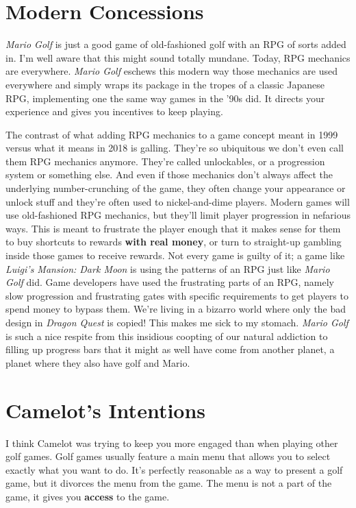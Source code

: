 \documentclass{book}
\begin{document}
\FloatBarrier\needspace{5pt}\section*{Modern Concessions}\nopagebreak[4]

\emph{Mario Golf} is just a good game of old-fashioned golf with an RPG of sorts added in. I’m well aware that this might sound totally mundane. Today, RPG mechanics are everywhere. \emph{Mario Golf} eschews this modern way those mechanics are used everywhere and simply wraps its package in the tropes of a classic Japanese RPG, implementing one the same way games in the ’90s did. It directs your experience and gives you incentives to keep playing.

The contrast of what adding RPG mechanics to a game concept meant in 1999 versus what it means in 2018 is galling. They’re so ubiquitous we don’t even call them RPG mechanics anymore. They’re called unlockables, or a progression system or something else. And even if those mechanics don’t always affect the underlying number-crunching of the game, they often change your appearance or unlock stuff and they’re often used to nickel-and-dime players. Modern games will use old-fashioned RPG mechanics, but they’ll limit player progression in nefarious ways. This is meant to frustrate the player enough that it makes sense for them to buy shortcuts to rewards \textbf{with real money}, or turn to straight-up gambling inside those games to receive rewards. Not every game is guilty of it; a game like \emph{Luigi’s Mansion: Dark Moon} is using the patterns of an RPG just like \emph{Mario Golf} did. Game developers have used the frustrating parts of an RPG, namely slow progression and frustrating gates with specific requirements to get players to spend money to bypass them. We’re living in a bizarro world where only the bad design in \emph{Dragon Quest} is copied! This makes me sick to my stomach. \emph{Mario Golf} is such a nice respite from this insidious coopting of our natural addiction to filling up progress bars that it might as well have come from another planet, a planet where they also have golf and Mario.

\FloatBarrier\needspace{5pt}\section*{Camelot’s Intentions}\nopagebreak[4]

I think Camelot was trying to keep you more engaged than when playing other golf games. Golf games usually feature a main menu that allows you to select exactly what you want to do. It’s perfectly reasonable as a way to present a golf game, but it divorces the menu from the game. The menu is not a part of the game, it gives you \textbf{access} to the game.
\end{document}
